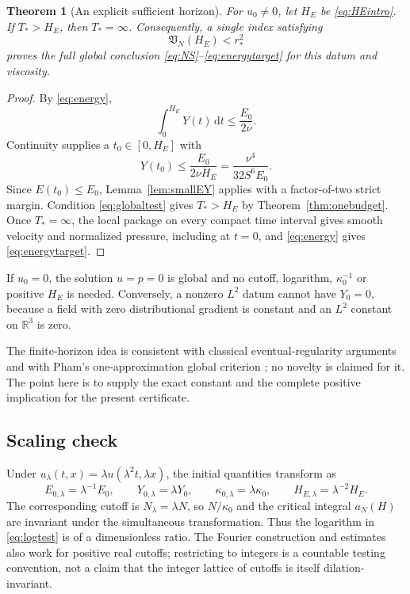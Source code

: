 \documentclass[11pt,a4paper]{article}
\newtheorem{theorem}{Theorem}[section]
\theoremstyle{definition}\newtheorem{definition}[theorem]{Definition}
\theoremstyle{remark}\newtheorem{remark}[theorem]{Remark}
\newcommand{\R}{\mathbb R}
\newcommand{\dd}{\,\mathrm d}
\newcommand{\rstar}{r_*}
\newcommand{\kin}{\kappa_0}
\numberwithin{equation}{section}
\begin{document}
\begin{theorem}[An explicit sufficient horizon]\label{thm:finitehorizon}
For $u_0\ne0$, let $H_E$ be \eqref{eq:HEintro}. If $T_*>H_E$, then $T_*=\infty$. Consequently, a single index satisfying
\begin{equation}\label{eq:globaltest}
 \mathfrak V_N(H_E)<\rstar^2
\end{equation}
proves the full global conclusion \eqref{eq:NS}--\eqref{eq:energytarget} for this datum and viscosity.
\end{theorem}
\begin{proof}
By \eqref{eq:energy},
\[
 \int_0^{H_E}Y(t)\dd t\le\frac{E_0}{2\nu}.
\]
Continuity supplies a $t_0\in[0,H_E]$ with
\[
 Y(t_0)\le\frac{E_0}{2\nu H_E}
 =\frac{\nu^4}{32S^6E_0}.
\]
Since $E(t_0)\le E_0$, Lemma~\ref{lem:smallEY} applies with a factor-of-two strict margin. Condition \eqref{eq:globaltest} gives $T_*>H_E$ by Theorem~\ref{thm:onebudget}. Once $T_*=\infty$, the local package on every compact time interval gives smooth velocity and normalized pressure, including at $t=0$, and \eqref{eq:energy} gives \eqref{eq:energytarget}.
\end{proof}

If $u_0=0$, the solution $u=p=0$ is global and no cutoff, logarithm, $\kin^{-1}$ or positive $H_E$ is needed. Conversely, a nonzero $L^2$ datum cannot have $Y_0=0$, because a field with zero distributional gradient is constant and an $L^2$ constant on $\R^3$ is zero.

The finite-horizon idea is consistent with classical eventual-regularity arguments and with Pham's one-approximation global criterion \cite{Pham}; no novelty is claimed for it. The point here is to supply the exact constant and the complete positive implication for the present certificate.

\subsection{Scaling check}
Under $u_\lambda(t,x)=\lambda u(\lambda^2t,\lambda x)$, the initial quantities transform as
\[
 E_{0,\lambda}=\lambda^{-1}E_0,\qquad
 Y_{0,\lambda}=\lambda Y_0,\qquad
 \kappa_{0,\lambda}=\lambda\kin,\qquad H_{E,\lambda}=\lambda^{-2}H_E.
\]
The corresponding cutoff is $N_\lambda=\lambda N$, so $N/\kin$ and the critical integral $a_N(H)$ are invariant under the simultaneous transformation. Thus the logarithm in \eqref{eq:logtest} is of a dimensionless ratio. The Fourier construction and estimates also work for positive real cutoffs; restricting to integers is a countable testing convention, not a claim that the integer lattice of cutoffs is itself dilation-invariant.
\end{document}
